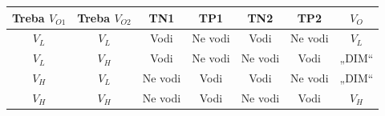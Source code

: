 \begingroup\sitneoznake\renewcommand{\arraystretch}{1.0}\setlength{\tabcolsep}{9pt}
\begin{tabular}{ccccccc}\toprule
\textbf{Treba $V_{O1}$} & \textbf{Treba $V_{O2}$} & \textbf{TN1} & \textbf{TP1} & \textbf{TN2} & \textbf{TP2} & $V_O$\\\midrule
$V_L$ & $V_L$ & Vodi & Ne vodi & Vodi & Ne vodi & $V_L$\\
$V_L$ & $V_H$ & \textcolor{blue!65!black}{Vodi} & Ne vodi & Ne vodi & \textcolor{blue!65!black}{Vodi} & \textcolor{blue!65!black}{„DIM“}\\
$V_H$ & $V_L$ & Ne vodi & \textcolor{DEcrvena}{Vodi} & \textcolor{DEcrvena}{Vodi} & Ne vodi & \textcolor{DEcrvena}{„DIM“}\\
$V_H$ & $V_H$ & Ne vodi & Vodi & Ne vodi & Vodi & $V_H$\\\bottomrule
\end{tabular}\endgroup
